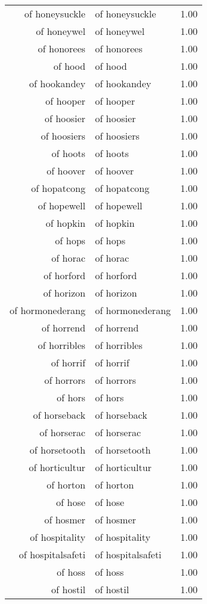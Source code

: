 \begin{table}[ht]
\begin{tabular}{rlr}
  of honeysuckle & of honeysuckle & 1.00 \\ 
  of honeywel & of honeywel & 1.00 \\ 
  of honorees & of honorees & 1.00 \\ 
  of hood & of hood & 1.00 \\ 
  of hookandey & of hookandey & 1.00 \\ 
  of hooper & of hooper & 1.00 \\ 
  of hoosier & of hoosier & 1.00 \\ 
  of hoosiers & of hoosiers & 1.00 \\ 
  of hoots & of hoots & 1.00 \\ 
  of hoover & of hoover & 1.00 \\ 
  of hopatcong & of hopatcong & 1.00 \\ 
  of hopewell & of hopewell & 1.00 \\ 
  of hopkin & of hopkin & 1.00 \\ 
  of hops & of hops & 1.00 \\ 
  of horac & of horac & 1.00 \\ 
  of horford & of horford & 1.00 \\ 
  of horizon & of horizon & 1.00 \\ 
  of hormonederang & of hormonederang & 1.00 \\ 
  of horrend & of horrend & 1.00 \\ 
  of horribles & of horribles & 1.00 \\ 
  of horrif & of horrif & 1.00 \\ 
  of horrors & of horrors & 1.00 \\ 
  of hors & of hors & 1.00 \\ 
  of horseback & of horseback & 1.00 \\ 
  of horserac & of horserac & 1.00 \\ 
  of horsetooth & of horsetooth & 1.00 \\ 
  of horticultur & of horticultur & 1.00 \\ 
  of horton & of horton & 1.00 \\ 
  of hose & of hose & 1.00 \\ 
  of hosmer & of hosmer & 1.00 \\ 
  of hospitality & of hospitality & 1.00 \\ 
  of hospitalsafeti & of hospitalsafeti & 1.00 \\ 
  of hoss & of hoss & 1.00 \\ 
  of hostil & of hostil & 1.00 \\ 

\end{tabular}
\end{table}
